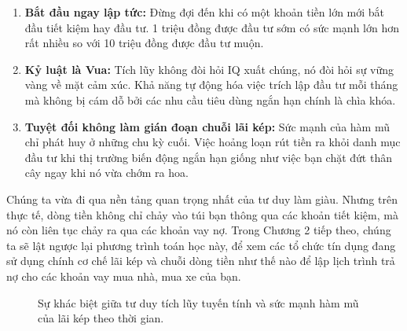\documentclass[14pt, a4paper, oneside]{extreport}
\begin{document}
\begin{enumerate}
    \item \textbf{Bắt đầu ngay lập tức:} Đừng đợi đến khi có một khoản tiền lớn mới bắt đầu tiết kiệm hay đầu tư. 1 triệu đồng được đầu tư sớm có sức mạnh lớn hơn rất nhiều so với 10 triệu đồng được đầu tư muộn.
    \item \textbf{Kỷ luật là Vua:} Tích lũy không đòi hỏi IQ xuất chúng, nó đòi hỏi sự vững vàng về mặt cảm xúc. Khả năng tự động hóa việc trích lập đầu tư mỗi tháng mà không bị cám dỗ bởi các nhu cầu tiêu dùng ngắn hạn chính là chìa khóa.
    \item \textbf{Tuyệt đối không làm gián đoạn chuỗi lãi kép:} Sức mạnh của hàm mũ chỉ phát huy ở những chu kỳ cuối. Việc hoảng loạn rút tiền ra khỏi danh mục đầu tư khi thị trường biến động ngắn hạn giống như việc bạn chặt đứt thân cây ngay khi nó vừa chớm ra hoa.
\end{enumerate}

Chúng ta vừa đi qua nền tảng quan trọng nhất của tư duy làm giàu. Nhưng trên thực tế, dòng tiền không chỉ chảy vào túi bạn thông qua các khoản tiết kiệm, mà nó còn liên tục chảy ra qua các khoản vay nợ. Trong Chương 2 tiếp theo, chúng ta sẽ lật ngược lại phương trình toán học này, để xem các tổ chức tín dụng đang sử dụng chính cơ chế lãi kép và chuỗi dòng tiền như thế nào để lập lịch trình trả nợ cho các khoản vay mua nhà, mua xe của bạn.

\begin{figure}[htbp]
    \centering
    \caption{Sự khác biệt giữa tư duy tích lũy tuyến tính và sức mạnh hàm mũ của lãi kép theo thời gian.}
    \label{fig:laikep}
\end{figure}
\end{document}
